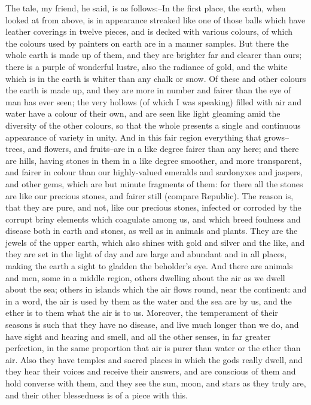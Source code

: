The tale, my friend, he said, is as follows:--In the first place, the
earth, when looked at from above, is in appearance streaked like one of
those balls which have leather coverings in twelve pieces, and is decked
with various colours, of which the colours used by painters on earth are
in a manner samples. But there the whole earth is made up of them,
and they are brighter far and clearer than ours; there is a purple of
wonderful lustre, also the radiance of gold, and the white which is in
the earth is whiter than any chalk or snow. Of these and other colours
the earth is made up, and they are more in number and fairer than the
eye of man has ever seen; the very hollows (of which I was speaking)
filled with air and water have a colour of their own, and are seen like
light gleaming amid the diversity of the other colours, so that the
whole presents a single and continuous appearance of variety in unity.
And in this fair region everything that grows--trees, and flowers, and
fruits--are in a like degree fairer than any here; and there are hills,
having stones in them in a like degree smoother, and more transparent,
and fairer in colour than our highly-valued emeralds and sardonyxes and
jaspers, and other gems, which are but minute fragments of them: for
there all the stones are like our precious stones, and fairer still
(compare Republic). The reason is, that they are pure, and not, like
our precious stones, infected or corroded by the corrupt briny elements
which coagulate among us, and which breed foulness and disease both in
earth and stones, as well as in animals and plants. They are the jewels
of the upper earth, which also shines with gold and silver and the like,
and they are set in the light of day and are large and abundant and in
all places, making the earth a sight to gladden the beholder's eye.
And there are animals and men, some in a middle region, others dwelling
about the air as we dwell about the sea; others in islands which the air
flows round, near the continent: and in a word, the air is used by them
as the water and the sea are by us, and the ether is to them what the
air is to us. Moreover, the temperament of their seasons is such that
they have no disease, and live much longer than we do, and have
sight and hearing and smell, and all the other senses, in far greater
perfection, in the same proportion that air is purer than water or the
ether than air. Also they have temples and sacred places in which the
gods really dwell, and they hear their voices and receive their answers,
and are conscious of them and hold converse with them, and they see the
sun, moon, and stars as they truly are, and their other blessedness is
of a piece with this.

